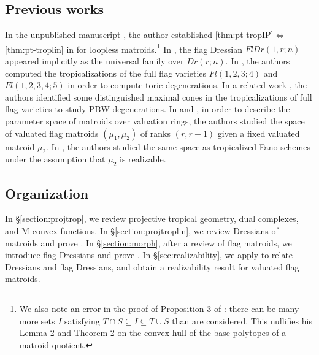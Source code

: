 \documentclass[11pt]{amsart}
\theoremstyle{definition}
\begin{document}
\subsection{Previous works}
\label{previousworks}
In the unpublished manuscript \cite{Haq12}, the author established \ref{thm:pt-tropIP}$\iff$\ref{thm:pt-troplin} in  for loopless matroids.\footnote{We also note an error in the proof of Proposition 3 of \cite{Haq12}: there can be many more sets $I$ satisfying $T\cap S \subseteq I \subseteq T \cup S$ than are considered. This nullifies his Lemma 2 and Theorem 2 on the convex hull of the base polytopes of a matroid quotient.}
In \cite[\S4.3]{MS15}, the flag Dressian $FlDr(1,r;n)$ appeared implicitly as the universal family over $Dr(r;n)$.
In \cite{BLMM17}, the authors computed the tropicalizations of the full flag varieties $Fl(1,2,3;4)$ and $Fl(1,2,3,4;5)$ in order to compute toric degenerations.  In a related work \cite{FFFM19}, the authors identified some distinguished maximal cones in the tropicalizations of full flag varieties to study PBW-degenerations.
In \cite[\S5]{FM16} and \cite[\S6]{FM19}, in order to describe the parameter space of matroids over valuation rings, the authors studied the space of valuated flag matroids $(\mu_1, \mu_2)$ of ranks $(r,r+1)$ given a fixed valuated matroid $\mu_2$.
In \cite{JMRS20}, the authors studied the same space as tropicalized Fano schemes under the assumption that $\mu_2$ is realizable.

\subsection{Organization}
\label{organization}
In \S\ref{section:projtrop}, we review projective tropical geometry,  dual complexes, and M-convex functions.  In \S\ref{section:projtroplin}, we review Dressians of matroids and prove .  In \S\ref{section:morph}, after a review of flag matroids, we introduce flag Dressians and prove .  In \S\ref{sec:realizability}, we apply  to relate Dressians and flag Dressians, and obtain a realizability result for valuated flag matroids.
\end{document}
